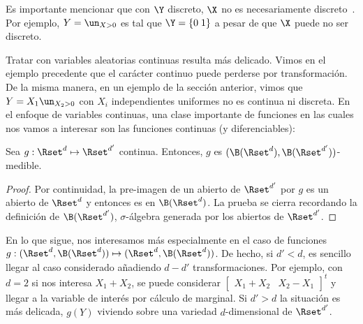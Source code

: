 Es  importante  mencionar que  con  $\Y$  discreto,  $\X$ no  es  necesariamente
discreto~\cite{AthLah06}. Por ejemplo, $Y = \un_{X>0}$  es tal que $\Y = \{ 0 \;
1 \}$ a pesar de que $\X$ puede no ser discreto.

Tratar con  variables aleatorias continuas  resulta m\'as delicado. Vimos  en el
ejemplo   precedente   que   el   car\'acter   continuo   puede   perderse   por
transformaci\'on. De  la misma manera, en  un ejemplo de  la secci\'on anterior,
vimos  que  $Y =  X_1  \un_{X_2>0}$ con  $X_i$  independientes  uniformes no  es
continua  ni  discreta.   En  el  enfoque  de  variables  continuas,  una  clase
importante de  funciones en las cuales  nos vamos a interesar  son las funciones
continuas (y diferenciables):
%
\begin{lema}
\label{Lem:MP:ContinuidadCaracterMedible}
%
  Sea   $g:   \Rset^d   \mapsto   \Rset^{d'}$   continua.   Entonces,   $g$   es
  $(\B(\Rset^d),\B(\Rset^{d'}))$-medible.
\end{lema}
%
\begin{proof}
  Por continuidad,  la pre-imagen de  un abierto de  $\Rset^{d'}$ por $g$  es un
  abierto  de $\Rset^d$  y entonces  es en  $\B(\Rset^d)$. La  prueba  se cierra
  recordando  la definici\'on  de $\B(\Rset^{d'})$,  $\sigma$-\'algebra generada
  por los abiertos de $\Rset^{d'}$.
\end{proof}

En lo que sigue, nos interesamos m\'as especialmente en el caso de funciones $g:
(\Rset^d ,  \B(\Rset^d)) \mapsto (\Rset^d ,  \B(\Rset^d))$.  De hecho,  si $d' <
d$,   es    sencillo   llegar    al   caso   considerado    a\~nadiendo   $d-d'$
transformaciones. Por ejemplo, con $d = 2$ si nos interesa $X_1 + X_2$, se puede
considerar $\begin{bmatrix} X_1 + X_2 &  X_2 - X_1\end{bmatrix}^t$ y llegar a la
variable de inter\'es  por c\'alculo de marginal. Si $d' >  d$ la situaci\'on es
m\'as  delicada,   $g(Y)$  viviendo   sobre  una  variedad   $d$-dimensional  de
$\Rset^{d'}$.

